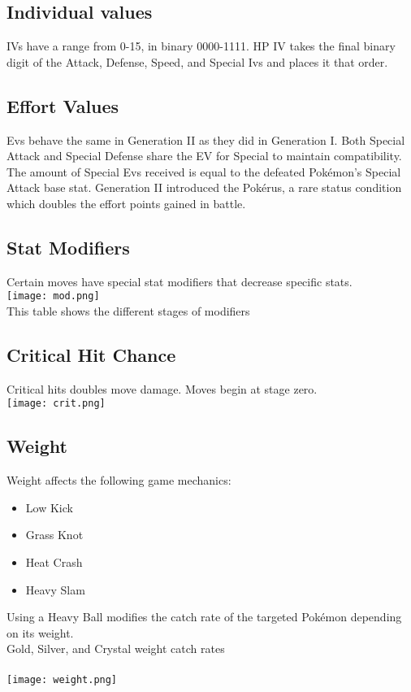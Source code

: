 \documentclass[11pt,fleqn]{book} %
\begin{document}
\subsection{Individual values}
IVs have a range from 0-15, in binary 0000-1111. HP IV takes the final binary digit of the Attack, Defense, Speed, and Special Ivs and places it that order.
\subsection{Effort Values}
Evs behave the same in Generation II as they did in Generation I. Both Special Attack and Special Defense share the EV for Special to maintain compatibility. The amount of Special Evs received is equal to the defeated Pokémon’s Special Attack base stat. 
Generation II introduced the Pokérus, a rare status condition which doubles the effort points gained in battle.
\subsection{Stat Modifiers}
Certain moves have special stat modifiers that decrease specific stats.\\
\texttt{[image: mod.png]}\\
This table shows the different stages of modifiers
\subsection{Critical Hit Chance}
Critical hits doubles move damage. Moves begin at stage zero.\\
\texttt{[image: crit.png]}\\
\subsection{Weight}
 Weight affects the following game mechanics: 
 \begin{itemize}
 	\item Low Kick
 	\item Grass Knot
 	\item Heat Crash
 	\item Heavy Slam
 \end{itemize}
 Using a Heavy Ball modifies the catch rate of the targeted Pokémon depending on its weight.\\
Gold, Silver, and Crystal weight catch rates\\\\
\texttt{[image: weight.png]}\\
\end{document}
